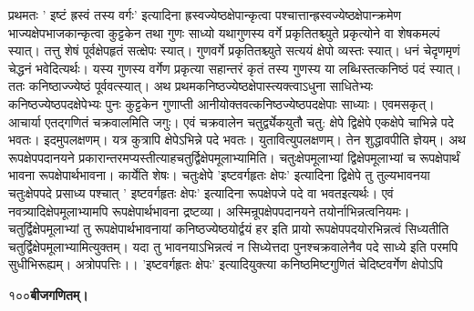 \documentclass[11pt, openany]{book}
\begin{document}
\begin{sloppypar}
\hangindent=0.2in \hspace{0.2in}प्रथमतः ' इष्टं ह्रस्वं तस्य वर्गः' इत्यादिना ह्रस्वज्येष्ठक्षेपान्कृत्वा पश्चात्तान्ह्रस्वज्येष्ठक्षेपान्क्रमेण भाज्यक्षेपभाजकान्कृत्वा कुट्टकेन तथा गुणः साध्यो यथागुणस्य वर्गे प्रकृतितश्च्युते प्रकृत्योने वा शेषकमल्पं स्यात्। तत्तु शेषं पूर्वक्षेपहृतं सत्क्षेपः स्यात्। गुणवर्गे प्रकृतितश्च्युते सत्ययं क्षेपो व्यस्तः स्यात्। धनं चेदृणमृणं चेद्धनं भवेदित्यर्थः। यस्य गुणस्य वर्गेण प्रकृत्या सहान्तरं कृतं तस्य गुणस्य या लब्धिस्तत्कनिष्ठं पदं स्यात्। ततः कनिष्ठाज्ज्येष्ठं पूर्ववत्स्यात्। अथ प्रथमकनिष्ठज्येष्ठक्षेपास्त्यक्त्वाऽधुना साधितेभ्यः कनिष्ठज्येष्ठपदक्षेपेभ्यः पुनः कुट्टकेन गुणाप्ती आनीयोक्तवत्कनिष्ठज्येष्ठपदक्षेपाः साध्याः। एवमसकृत्। आचार्या एतद्गणितं चक्रवालमिति जगुः। एवं चक्रवालेन चतुर्द्व्येकयुतौ चतु: क्षेपे द्विक्षेपे एकक्षेपे चाभिन्ने पदे भवतः। इदमुपलक्षणम्। यत्र कुत्रापि क्षेपेऽभिन्ने पदे भवतः। युतावित्युपलक्षणम्। तेन शुद्धावपीति ज्ञेयम्। अथ रूपक्षेपपदानयने प्रकारान्तरमप्यस्तीत्याह\textendash चतुर्द्विक्षेपमूलाभ्यामिति। चतुःक्षेपमूलाभ्यां द्विक्षेपमूलाभ्यां च रूपक्षेपार्थं भावना रूपक्षेपार्थभावना। कार्येति शेषः। चतुःक्षेपे 'इष्टवर्गहृतः क्षेपः' इत्यादिना द्विक्षेपे तु तुल्यभावनया चतुःक्षेपपदे प्रसाध्य पश्चात् ' इष्टवर्गहृतः क्षेपः' इत्यादिना रूपक्षेपजे पदे वा भवतइत्यर्थः। एवं नवत्र्यादिक्षेपमूलाभ्यामपि रूपक्षेपार्थभावना द्रष्टव्या। अस्मिन्रूपक्षेपपदानयने तयोर्नाभिन्नत्वनियमः। चतुर्द्विक्षेपमूलाभ्यां तु रूपक्षेपार्थभावनायां कनिष्ठज्येष्ठयोर्द्वयं हर इति प्रायो रूपक्षेपपदयोरभिन्नत्वं सिध्यतीति चतुर्द्विक्षेपमूलाभ्यामित्युक्तम्। यदा तु भावनयाऽभिन्नत्वं न सिध्येत्तदा पुनश्चक्रवालेनैव पदे साध्ये इति परमपि सुधीभिरूह्यम्। अत्रोपपत्तिः।। 'इष्टवर्गहृतः क्षेपः' इत्यादियुक्त्या कनिष्ठमिष्टगुणितं चेदिष्टवर्गेण क्षेपोऽपि
\end{sloppypar}
\thispagestyle{empty}
\newpage

\onehalfspacing
१००\hspace{2in}\textbf{बीजगणितम्।} 

\vspace{5mm}
\end{document}
